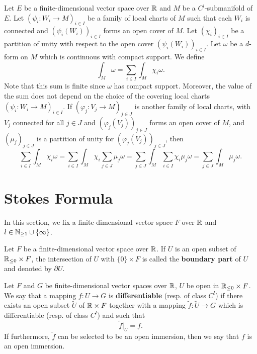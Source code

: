 \begin{definitionenv}
    Let $E$ be a finite-dimensional vector space over $\mathbb{R}$ and $M$ be a $C^l$-submanifold of $E$.
    Let $(\psi_i : W_i \longrightarrow M)_{i \in I}$ be a family of local charts of $M$ such that each $W_i$ is connected and $(\psi_i(W_i))_{i \in I}$ forms an open cover of $M$.
    Let $(\chi_i)_{i \in I}$ be a partition of unity with respect to the open cover $(\psi_i(W_i))_{i \in I}$.
    Let $\omega$ be a $d$-form on $M$ which is continuous with compact support.
    We define
    $$\int_{M} \omega = \sum_{i \in I} \int_{M} \chi_i \omega.$$
    Note that this sum is finite since $\omega$ has compact support.
    Moreover, the value of the sum does not depend on the choice of the covering local charts $(\psi_i : W_i \longrightarrow M)_{i \in I}$.
    If $(\varphi_j : V_j \longrightarrow M)_{j \in J}$ is another family of local charts, with $V_j$ connected for all $j \in J$ and $(\varphi_j(V_j))_{j \in J}$ forms an open cover of $M$,
    and $(\mu_j)_{j \in J}$ is a partition of unity for $(\varphi_j(V_j))_{j \in J}$, then
    $$\sum_{i \in I} \int_{M} \chi_i \omega = \sum_{i \in I} \int_{M} \chi_i \sum_{j \in J} \mu_j \omega = \sum_{j \in J} \int_{M} \sum_{i \in I} \chi_i \mu_{j} \omega = \sum_{j \in J} \int_{M} \mu_j \omega.$$
\end{definitionenv}


\section{Stokes Formula}

In this section, we fix a finite-dimensional vector space $F$ over $\mathbb{R}$ and $l \in \mathbb{N}_{\ge 1} \cup \{\infty\}$.

\begin{definitionenv}
    Let $F$ be a finite-dimensional vector space over $\mathbb{R}$.
    If $U$ is an open subset of $\mathbb{R}_{\le 0} \times F$, the intersection of $U$ with $\{0\} \times F$ is called the \textbf{boundary part} of $U$ and denoted by $\partial U$.
\end{definitionenv}

\begin{definitionenv}
    Let $F$ and $G$ be finite-dimensional vector spaces over $\mathbb{R}$,
    $U$ be open in $\mathbb{R}_{\le 0} \times F$.
    We say that a mapping $f: U \longrightarrow G$ is \textbf{differentiable} (resp. of class $C^l$)
    if there exists an open subset $\tilde{U}$ of $\mathbb{R} \times F$ together with a mapping $\tilde{f} : \tilde{U} \longrightarrow G$ which is differentiable (resp. of class $C^l$) and such that
    $$\tilde{f} |_{U} = f.$$
    If furthermore, $\tilde{f}$ can be selected to be an open immersion, then we say that $f$ is an open immersion.
\end{definitionenv}

